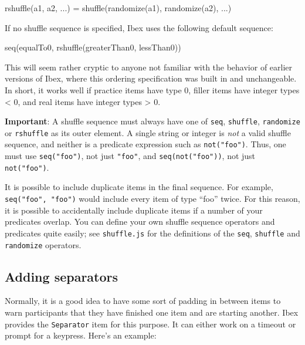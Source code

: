 \documentclass[]{article}
\newenvironment{Shaded}{}{}
\newcommand{\FunctionTok}[1]{\textcolor[rgb]{0.02,0.16,0.49}{{#1}}}
\newcommand{\NormalTok}[1]{{#1}}
\begin{document}
\begin{Shaded}
\begin{Highlighting}[]
    \FunctionTok{rshuffle}\NormalTok{(a1, a2, ...) = }\FunctionTok{shuffle}\NormalTok{(}\FunctionTok{randomize}\NormalTok{(a1), }\FunctionTok{randomize}\NormalTok{(a2), ...)}
\end{Highlighting}
\end{Shaded}

If no shuffle sequence is specified, Ibex uses the following default
sequence:

\begin{Shaded}
\begin{Highlighting}[]
    \FunctionTok{seq}\NormalTok{(equalTo0, }\FunctionTok{rshuffle}\NormalTok{(greaterThan0, lessThan0))}
\end{Highlighting}
\end{Shaded}

This will seem rather cryptic to anyone not familiar with the behavior
of earlier versions of Ibex, where this ordering specification was built
in and unchangeable. In short, it works well if practice items have type
0, filler items have integer types \textless{} 0, and real items have
integer types \textgreater{} 0.

\textbf{Important}: A shuffle sequence must always have one of
\texttt{seq}, \texttt{shuffle}, \texttt{randomize} or \texttt{rshuffle}
as its outer element. A single string or integer is \emph{not} a valid
shuffle sequence, and neither is a predicate expression such as
\texttt{not("foo")}. Thus, one must use \texttt{seq("foo")}, not just
\texttt{"foo"}, and \texttt{seq(not("foo"))}, not just
\texttt{not("foo")}.

It is possible to include duplicate items in the final sequence. For
example, \texttt{seq("foo",\ "foo")} would include every item of type
``foo'' twice. For this reason, it is possible to accidentally include
duplicate items if a number of your predicates overlap. You can define
your own shuffle sequence operators and predicates quite easily; see
\texttt{shuffle.js} for the definitions of the \texttt{seq},
\texttt{shuffle} and \texttt{randomize} operators.

\subsection{Adding separators}\label{adding-separators}

Normally, it is a good idea to have some sort of padding in between
items to warn participants that they have finished one item and are
starting another. Ibex provides the \texttt{Separator} item for this
purpose. It can either work on a timeout or prompt for a keypress.
Here's an example:
\end{document}
